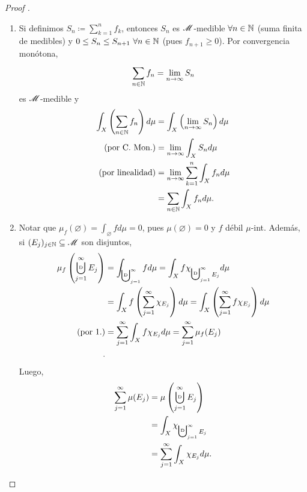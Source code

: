 \begin{proof}[Proof ]
	\begin{enumerate}
		\item Si definimos $S_{n} \coloneq \sum_{k=1}^{n} f_{k}$, entonces $S_{n}$ es $\mathscr{M}$-medible $\forall n\in\mathbb{N}$ (suma finita de medibles) y $0 \leq S_{n} \leq S_{n+1} \ \forall n \in \mathbb{N}$ (pues $f_{n+1} \geq 0$). Por convergencia monótona,
		\[ \sum_{n\in\mathbb{N}}^{} f_{n} = \lim_{n \to \infty} S_{n} \]
		es $\mathscr{M}$-medible y
		\begin{align*}
			\int_{X} \left( \sum_{n\in\mathbb{N}}^{} f_n \right) d\mu &= \int_{X} \left(\lim_{n \to \infty} S_{n} \right) d\mu \\
			(\text{por C. Mon.}) &= \lim_{n \to \infty} \int_{X} S_{n} d\mu \\
			(\text{por linealidad}) &= \lim_{n \to \infty} \sum_{k=1}^{n} \int_{X} f_{n} d\mu \\
			&= \sum_{n\in\mathbb{N}}^{} \int_{X} f_{n} d\mu.
		\end{align*}

		\item Notar que $\mu_{f}(\varnothing) = \int_{\varnothing} f d\mu = 0$, pues $\mu(\varnothing) = 0$ y $f$ débil $\mu$-int. Además, si $(E_{j})_{j\in\mathbb{N}} \subseteq \mathscr{M}$ son disjuntos,
		\begin{align*}
			\mu_{f}\left(\bigcupd_{j=1}^{\infty} E_{j} \right) &= \int_{\bigcupd_{j=1}^{\infty}} f d\mu = \int_{X} f \chi_{\bigcupd_{j=1}^{\infty} E_{j}} d\mu \\
			&= \int_{X} f \left( \sum_{j=1}^{\infty} \chi_{E_{j}} \right) d\mu = \int_{X} \left( \sum_{j=1}^{\infty} f \chi_{E_{j}} \right) d\mu \\
			(\text{por } 1.) &= \sum_{j=1}^{\infty} \int_{X} f \chi_{E_{j}} d\mu = \sum_{j=1}^{\infty} \mu_{f}(E_{j}) \\
		.\end{align*}	
		Luego,
		\begin{align*}
			\sum_{j=1}^{\infty} \mu(E_{j}) &= \mu \left( \bigcupd_{j=1}^{\infty} E_{j} \right) \\
			&= \int_{X} \chi_{\bigcupd_{j=1}^{\infty} E_{j}} \\
			&= \sum_{j=1}^{\infty} \int_{X} \chi_{E_{j}} d\mu
		.\qedhere\end{align*}
	\end{enumerate}
\end{proof}


